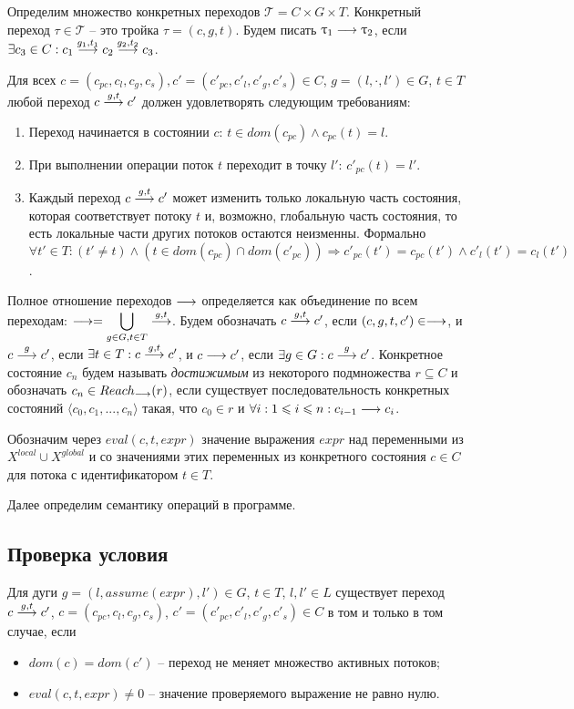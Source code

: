 Определим множество конкретных переходов $\mathcal{T}=C\times G \times T$.
Конкретный переход $\tau \in \mathcal{T}$ -- это тройка $\tau = (c, g, t)$. 
Будем писать $\uptau_1 \longrightarrow \uptau_2$, если $\exists c_3 \in C: c_1 \stackrel{g_1, t_1}{\longrightarrow} c_2 \stackrel{g_2, t_2}{\longrightarrow} c_3$.

Для всех $c=(c_{pc}, c_l, c_g, c_s), c'=(c'_{pc}, c'_l, c'_g, c'_s) \in C$, $g = (l, \cdot, l')\in G$, $t\in T$ любой переход $c \stackrel{g, t}{\longrightarrow} c'$ должен удовлетворять следующим требованиям:
\begin{enumerate}
\item Переход начинается в состоянии $c$: $t\in dom(c_{pc}) \land c_{pc}(t)=l$.
\item При выполнении операции поток $t$ переходит в точку $l'$: $c'_{pc}(t)=l'$.
\item Каждый переход $c \stackrel{g,t}{\longrightarrow} c'$ может изменить только локальную часть состояния, которая соответствует потоку $t$ и, возможно, глобальную часть состояния, то есть локальные части других потоков остаются неизменны.
Формально
$\forall t'\in T: (t'\neq t) \land (t \in dom(c_{pc})\cap dom(c'_{pc})) \Rightarrow c'_{pc}(t')=c_{pc}(t') \land c'_l(t')=c_l(t')$.
\end{enumerate}

Полное отношение переходов $\longrightarrow$ определяется как объединение по всем переходам: 
$\longrightarrow = \displaystyle\bigcup_{g \in G,t \in T} \stackrel{g,t}{\longrightarrow}$.
Будем обозначать $c \stackrel{g, t}{\longrightarrow} c'$, если $(c, g, t, c') \in \longrightarrow$, и
$c \stackrel{g}{\longrightarrow} c'$, если $\exists t\in T: c \stackrel{g,t}{\longrightarrow} c'$, и 
$c \longrightarrow c'$, если $\exists g\in G: c \stackrel{g}{\longrightarrow} c'$. 
Конкретное состояние $c_n$ будем называть \textit{достижимым} из некоторого подмножества $r \subseteq C$ и обозначать $c_n \in Reach_{\longrightarrow}(r)$, если существует последовательность конкретных состояний $\langle c_0, c_1, ..., c_n \rangle$ такая, что $c_0 \in r$ и $\forall i : 1 \leqslant i \leqslant n : c_{i-1} \longrightarrow c_i$.

Обозначим через $eval(c, t, expr)$ значение выражения $expr$ над переменными из $X^{local} \cup X^{global}$ и со значениями этих переменных из конкретного состояния $c \in C$ для потока с идентификатором $t \in T$. %

Далее определим семантику операций в программе.

\subsection{Проверка условия}
Для дуги $g = (l, assume(expr), l') \in G$, $t\in T$, $l, l' \in L$ существует переход $c \stackrel{g, t}{\longrightarrow} c'$, $c=(c_{pc}, c_l, c_g, c_s)$, $c'=(c'_{pc}, c'_l, c'_g, c'_s) \in C$ в том и только в том случае, если
\begin{itemize}
\item $dom(c)=dom(c')$ -- переход не меняет множество активных потоков;
\item $eval(c, t, expr) \neq 0$ -- значение проверяемого выражение не равно нулю.
\end{itemize}

